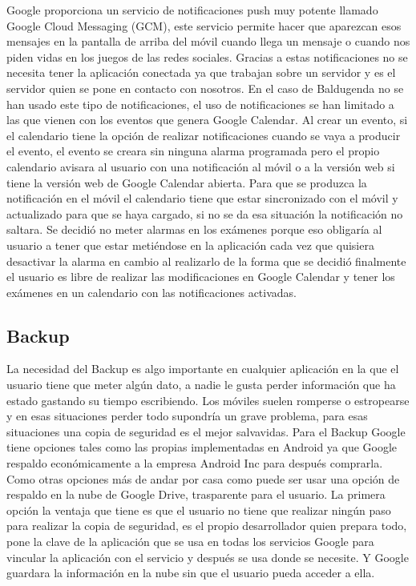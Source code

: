 Google proporciona un servicio de notificaciones push muy potente llamado Google Cloud Messaging (GCM), este servicio permite hacer que aparezcan esos mensajes en la pantalla de arriba del móvil cuando llega un mensaje o cuando nos piden vidas en los juegos de las redes sociales.
Gracias a estas notificaciones no se necesita tener la aplicación conectada ya que trabajan sobre un servidor y es el servidor quien se pone en contacto con nosotros.
En el caso de Baldugenda no se han usado este tipo de notificaciones, el uso de notificaciones se han limitado a las que vienen con los eventos que genera Google Calendar.
Al crear un evento, si el calendario tiene la opción de realizar notificaciones cuando se vaya a producir el evento,   el evento se creara sin ninguna alarma programada pero el propio calendario avisara al usuario con una notificación al móvil o a la versión web si tiene la versión web de Google Calendar abierta.
Para que se produzca la notificación en el móvil el calendario tiene que estar sincronizado con el móvil y actualizado para que se haya cargado, si no se da esa situación la notificación no saltara.
Se decidió no meter alarmas en los exámenes porque eso obligaría al usuario a tener que estar metiéndose en la aplicación cada vez que quisiera desactivar la alarma en cambio al realizarlo de la forma que se decidió finalmente el usuario es libre de realizar las modificaciones en Google Calendar y tener los exámenes en un calendario con las notificaciones activadas.

\subsection{Backup}
\label{subsecc:Backup}

La necesidad del Backup es algo importante en cualquier aplicación en la que el usuario tiene que meter algún dato, a nadie le gusta perder información que ha estado gastando su tiempo escribiendo. Los móviles suelen romperse o estropearse y en esas situaciones perder todo supondría un grave problema, para esas situaciones una copia de seguridad es el mejor salvavidas.
Para el Backup Google tiene opciones tales como las propias implementadas en Android ya que Google respaldo económicamente a la empresa Android Inc para después comprarla. Como otras opciones más de andar por casa como puede ser usar una opción de respaldo en la nube de Google Drive, trasparente para el usuario.
La primera opción la ventaja que tiene es que el usuario no tiene que realizar ningún paso para realizar la copia de seguridad, es el propio desarrollador quien prepara todo, pone la clave de la aplicación que se usa en todas los servicios Google para vincular la aplicación con el servicio y después se usa donde se necesite. Y Google guardara la información en la nube sin que el usuario pueda acceder a ella.

